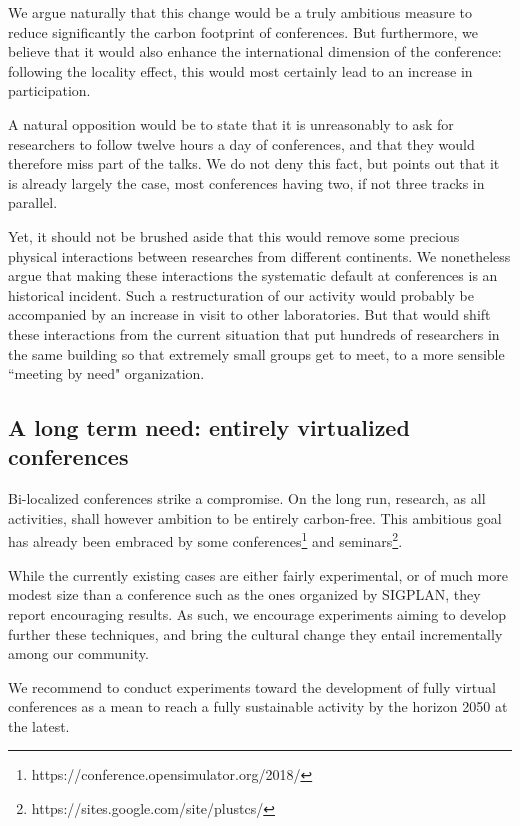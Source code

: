 We argue naturally that this change would be a truly ambitious measure to reduce
significantly the carbon footprint of conferences. But furthermore, we believe that
it would also enhance the international dimension of the conference: following
the locality effect, this would most certainly lead to an increase in participation.

A natural opposition would be to state that it is unreasonably to ask for researchers to
follow twelve hours a day of conferences, and that they would therefore miss part of the
talks. We do not deny this fact, but points out that it is already largely the case,
most conferences having two, if not three tracks in parallel.

Yet, it should not be brushed aside that this would remove some precious
physical interactions between researches from different continents. We
nonetheless argue that making these interactions the systematic default at conferences
is an historical incident. Such a restructuration of our activity would probably
be accompanied by an increase in visit to other laboratories. But that would shift
these interactions from the current situation that put hundreds of researchers in the
same building so that extremely small groups get to meet, to a more sensible ``meeting
by need" organization.

\subsection{A long term need: entirely virtualized conferences}

Bi-localized conferences strike a compromise. On the long run, research, as all
activities, shall however ambition to be entirely carbon-free. This ambitious
goal has already been embraced by some conferences\footnote{https://conference.opensimulator.org/2018/}
and seminars\footnote{https://sites.google.com/site/plustcs/}.

While the currently existing cases are either fairly experimental, or of much more
modest size than a conference such as the ones organized by SIGPLAN, they report
encouraging results. As such, we encourage experiments aiming to develop further
these techniques, and bring the cultural change they entail incrementally among
our community.

\begin{recommend}
  We recommend to conduct experiments toward the development of fully virtual
  conferences as a mean to reach a fully sustainable activity by the horizon 2050
  at the latest.
\end{recommend}

